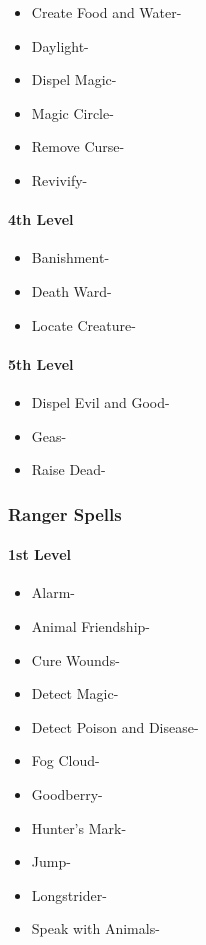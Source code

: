 \documentclass[
]{article}
\providecommand{\tightlist}{%
  \setlength{\itemsep}{0pt}\setlength{\parskip}{0pt}}
\begin{document}
\begin{itemize}
\tightlist
\item
  Create Food and Water-
\item
  Daylight-
\item
  Dispel Magic-
\item
  Magic Circle-
\item
  Remove Curse-
\item
  Revivify-
\end{itemize}

\hypertarget{4th-level-3}{%
\paragraph{4th Level}\label{4th-level-3}}

\begin{itemize}
\tightlist
\item
  Banishment-
\item
  Death Ward-
\item
  Locate Creature-
\end{itemize}

\hypertarget{5th-level-3}{%
\paragraph{5th Level}\label{5th-level-3}}

\begin{itemize}
\tightlist
\item
  Dispel Evil and Good-
\item
  Geas-
\item
  Raise Dead-
\end{itemize}

\hypertarget{ranger-spells}{%
\subsubsection{Ranger Spells}\label{ranger-spells}}

\hypertarget{1st-level-4}{%
\paragraph{1st Level}\label{1st-level-4}}

\begin{itemize}
\tightlist
\item
  Alarm-
\item
  Animal Friendship-
\item
  Cure Wounds-
\item
  Detect Magic-
\item
  Detect Poison and Disease-
\item
  Fog Cloud-
\item
  Goodberry-
\item
  Hunter's Mark-
\item
  Jump-
\item
  Longstrider-
\item
  Speak with Animals-
\end{itemize}
\end{document}
